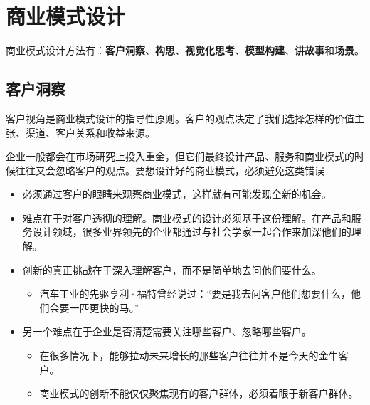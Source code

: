 \section{商业模式设计}

商业模式设计方法有：\textbf{客户洞察}、\textbf{构思}、\textbf{视觉化思考}、\textbf{模型构建}、\textbf{讲故事}和\textbf{场景}。

\subsection{客户洞察}

客户视角是商业模式设计的指导性原则。客户的观点决定了我们选择怎样的价值主张、渠道、客户关系和收益来源。

企业一般都会在市场研究上投入重金，但它们最终设计产品、服务和商业模式的时候往往又会忽略客户的观点。要想设计好的商业模式，必须避免这类错误
\begin{itemize}
    \item 必须通过客户的眼睛来观察商业模式，这样就有可能发现全新的机会。
    \item 难点在于对客户透彻的理解。商业模式的设计必须基于这份理解。在产品和服务设计领域，很多业界领先的企业都通过与社会学家一起合作来加深他们的理解。
    \item 创新的真正挑战在于深入理解客户，而不是简单地去问他们要什么。
    \begin{itemize}
        \item  汽车工业的先驱亨利·福特曾经说过：“要是我去问客户他们想要什么，他们会要一匹更快的马。”
    \end{itemize}
    \item 另一个难点在于企业是否清楚需要关注哪些客户、忽略哪些客户。
    \begin{itemize}
        \item 在很多情况下，能够拉动未来增长的那些客户往往并不是今天的金牛客户。
        \item 商业模式的创新不能仅仅聚焦现有的客户群体，必须着眼于新客户群体。
    \end{itemize}
\end{itemize}

